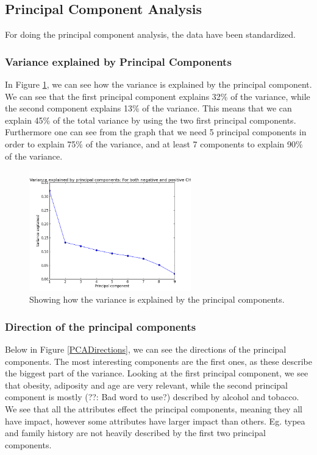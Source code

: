 \subsection{Principal Component Analysis}

For doing the principal component analysis, the data have been standardized.

\subsubsection{Variance explained by Principal Components}

In Figure \ref{VariancePCA}, we can see how the variance is explained by the principal component. We can see that the first principal component explains 32\% of the variance, while the second component explains 13\% of the variance. This means that we can explain 45\% of the total variance by using the two first principal components. Furthermore one can see from the graph that we need 5 principal components in order to explain 75\% of the variance, and at least 7 components to explain 90\% of the variance.

\begin{figure}[H]
\centering
\includegraphics[width=7cm, keepaspectratio=true]{pictures/PCAPosAndNeg.png}
\caption{Showing how the variance is explained by the principal components.}
\label{VariancePCA}
\end{figure}

\subsubsection{Direction of the principal components}

Below in Figure \ref{PCADirections}, we can see the directions of the principal components. The most interesting components are the first ones, as these describe the biggest part of the variance. Looking at the first principal component, we see that obesity, adiposity and age are very relevant, while the second principal component is mostly (??: Bad word to use?) described by alcohol and tobacco. We see that all the attributes effect the principal components, meaning they all have impact, however some attributes have larger impact than others. Eg. typea and family history are not heavily described by the first two principal components.

